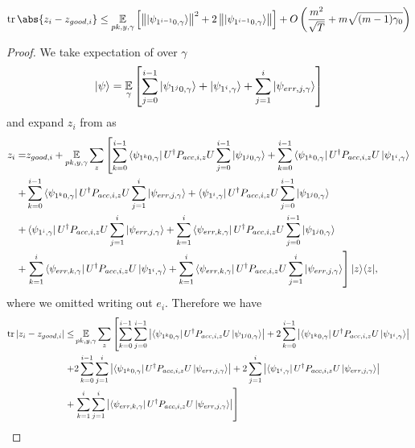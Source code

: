 \begin{lemma}
	\label{thm:zi-zgoodi}
	$$\tr\abs{z_i-z_{good, i}}\leq\E_{pk, y, \gamma}\L[\norm{\ket{\psi_{1^{i-1}0,\gamma}}}^2+ 2\norm{\ket{\psi_{1^{i-1}0,\gamma}}}\R]+O\L(\frac{m^2}{\sqrt T}+m\sqrt{(m-1)\gamma_0}\R)$$
\end{lemma}
\begin{proof}
	We take expectation of  over $\gamma$
	$$\ket{\psi}=\operatorname*{\mathbb{E}}_{\gamma}\left[
		\sum_{j=0}^{i-1} \ket{\psi_{1^j0,\gamma}} +\ket{\psi_{1^i,\gamma}} +\sum_{j=1}^{i}\ket{\psi_{err,j,\gamma}}
	\right]$$
	and expand $z_i$ from  as
	\begin{align}
		z_i=& z_{good,i}+ \operatorname*{\mathbb{E}}_{pk, y, \gamma} \sum_z \left[\sum_{k=0}^{i-1} \bra{\psi_{1^k0,\gamma}}U^\dag  P_{acc,i,z}U   \sum_{j=0}^{i-1} \ket{\psi_{1^j0,\gamma}}+
		\sum_{k=0}^{i-1} \bra{\psi_{1^k0,\gamma}}U^\dag  P_{acc,i,z}U \ket{\psi_{1^i,\gamma}}  \right. \nonumber \\
		+&  \sum_{k=0}^{i-1} \bra{\psi_{1^k0,\gamma}}U^\dag  P_{acc,i,z}U\sum_{j=1}^{i}\ket{\psi_{err,j,\gamma}}
		+\bra{\psi_{1^i,\gamma}} U^\dag  P_{acc,i,z}U \sum_{j=0}^{i-1} \ket{\psi_{1^j0,\gamma}}
		\nonumber \\
		+&  \bra{\psi_{1^i,\gamma}} U^\dag  P_{acc,i,z}U \sum_{j=1}^{i}\ket{\psi_{err,j,\gamma}}
		+\sum_{k=1}^{i}\bra{\psi_{err,k,\gamma}} U^\dag  P_{acc,i,z}U  \sum_{j=0}^{i-1} \ket{\psi_{1^j0,\gamma}}
		\nonumber \\
		+&\left.   \sum_{k=1}^{i}\bra{\psi_{err,k,\gamma}} U^\dag  P_{acc,i,z}U \ket{\psi_{1^i,\gamma}} +\sum_{k=1}^{i}\bra{\psi_{err,k,\gamma}} U^\dag  P_{acc,i,z}U \sum_{j=1}^{i}\ket{\psi_{err,j,\gamma}} \right] |z\rangle\langle z| , \nonumber     
	\end{align}
	where we omitted writing out $e_i$.
	Therefore we have
	\begin{align*}
		\tr|z_i-z_{good,i}|\leq& \E_{pk, y, \gamma} \sum_z \L[ \sum_{k=0}^{i-1} \sum_{j=0}^{i-1} \L| \bra{\psi_{1^k0,\gamma}}U^\dag  P_{acc,i,z}U \ket{\psi_{1^j0,\gamma}} \R|+
		2 \sum_{k=0}^{i-1} \L|\bra{\psi_{1^k0,\gamma}}U^\dag  P_{acc,i,z}U \ket{\psi_{1^i,\gamma}} \R|  \R. \\
		+& 2 \sum_{k=0}^{i-1}\sum_{j=1}^{i}\L| \bra{\psi_{1^k0,\gamma}}U^\dag  P_{acc,i,z}U\ket{\psi_{err,j,\gamma}}\R|    
		+2 \sum_{j=1}^{i}\L|\bra{\psi_{1^i,\gamma}} U^\dag  P_{acc,i,z}U \ket{\psi_{err,j,\gamma}}\R| \\
		+&\L. \sum_{k=1}^{i}\sum_{j=1}^{i}\L| \bra{\psi_{err,k,\gamma}} U^\dag  P_{acc,i,z}U \ket{\psi_{err,j,\gamma}}\R| \R] \\ %

\end{align*}
\end{proof}
